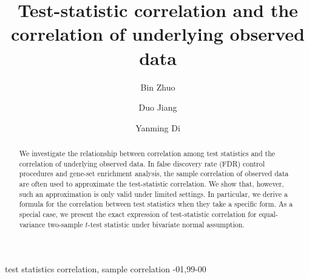 \documentclass[review]{elsarticle}
\newcommand{\popucor}{the correlation of underlying observed data}
\begin{document}
\begin{frontmatter}

\title{Test-statistic correlation and \popucor}

\author[mymainaddress]{Bin Zhuo}

\author[mymainaddress]{Duo Jiang}

\author[mymainaddress]{Yanming Di}

\address[mymainaddress]{Department of Statistics, Oregon State University, Corvallis, OR, USA }

\begin{abstract}
	We investigate the relationship between correlation among test statistics and \popucor. 
	In false discovery rate (FDR) control procedures and gene-set enrichment analysis, 
	the sample correlation of observed data are often used to approximate the 
	test-statistic correlation. We show that, however, such an approximation is only valid 
	under limited settings. In particular, we derive a formula for the correlation between test 
	statistics when they take a specific form. As a special case, we present the exact expression of 
	test-statistic correlation for equal-variance two-sample $t$-test statistic under bivariate 
	normal assumption. 
\end{abstract}

\begin{keyword}
test statistics correlation, sample correlation
-01\sep  99-00
\end{keyword}

\end{frontmatter}

\linenumbers
\end{document}
